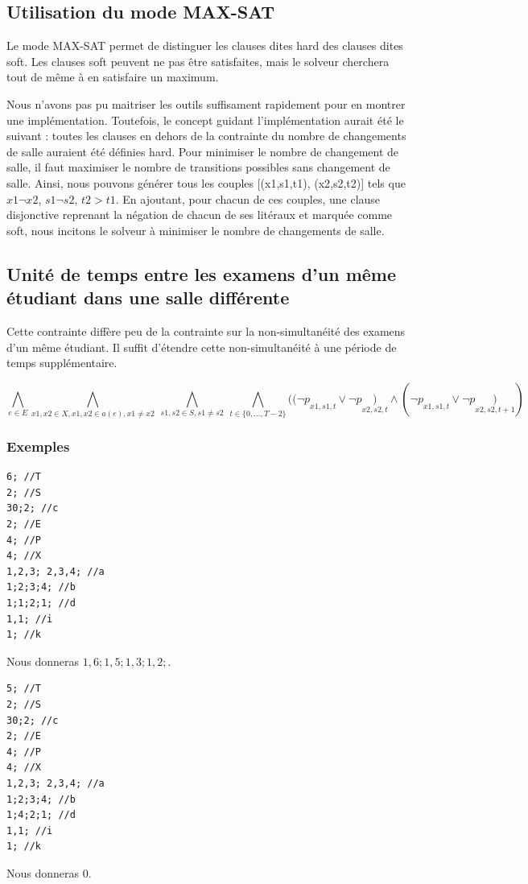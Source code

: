 \documentclass[a4paper,10pt]{article}
\begin{document}
\subsection{Utilisation du mode MAX-SAT}
Le mode MAX-SAT permet de distinguer les clauses dites hard des clauses dites soft.
Les clauses soft peuvent ne pas être satisfaites, mais le solveur cherchera tout de 
même à en satisfaire un maximum.

Nous n'avons pas pu maitriser les outils suffisament rapidement pour en montrer
une implémentation. Toutefois, le concept guidant l'implémentation aurait été le suivant :
toutes les clauses en dehors de la contrainte du nombre de changements de salle
auraient été définies hard. Pour minimiser le nombre de changement de salle,
il faut maximiser le nombre de transitions possibles sans changement de salle.
Ainsi, nous pouvons générer tous les couples [(x1,s1,t1), (x2,s2,t2)] tels que 
$x1 \neg x2$, $s1 \neg s2$, $t2 > t1$. En ajoutant, pour chacun de ces couples,
une clause disjonctive reprenant la négation de chacun de ses litéraux et marquée comme soft,
nous incitons le solveur à minimiser le nombre de changements de salle.

\subsection{Unité de temps entre les examens d'un même étudiant dans une salle différente}
Cette contrainte diffère peu de la contrainte sur la non-simultanéité des examens d'un même étudiant.
Il suffit d'étendre cette non-simultanéité à une période de temps supplémentaire.

\begin{equation}
\bigwedge\limits_{e \in E}
\bigwedge\limits_{x1,x2 \in X, x1,x2 \in a(e), x1 \neq x2}\ \bigwedge\limits_{s1,s2 \in S, s1 \neq s2}\ \bigwedge\limits_{t \in \{0,...,T-2\}} ( 
(\neg p\underset{x1,s1,t}\ \lor \neg p\underset{x2,s2,t}) \wedge 
(\neg p\underset{x1,s1,t}\ \lor \neg p\underset{x2,s2,t+1} ) )
\end{equation}

\subsubsection{Exemples}
\begin{lstlisting}[frame=single]
6; //T
2; //S
30;2; //c
2; //E
4; //P
4; //X
1,2,3; 2,3,4; //a
1;2;3;4; //b
1;1;2;1; //d
1,1; //i
1; //k
\end{lstlisting}
Nous donneras $1,6;1,5;1,3;1,2;$.
\begin{lstlisting}[frame=single]
5; //T
2; //S
30;2; //c
2; //E
4; //P
4; //X
1,2,3; 2,3,4; //a
1;2;3;4; //b
1;4;2;1; //d
1,1; //i
1; //k
\end{lstlisting}
Nous donneras $0$.
\end{document}
